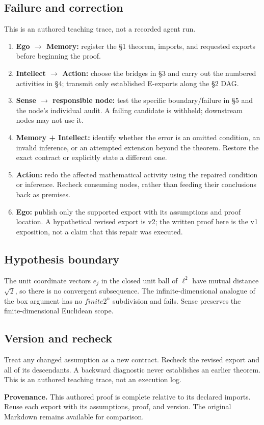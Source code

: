 \documentclass[preprint,12pt,aps,pra,showkeys,amsmath,amssymb,superscriptaddress,floatfix]{revtex4-2}
\theoremstyle{definition}
\theoremstyle{remark}
\providecommand{\tightlist}{\setlength{\itemsep}{2pt}\setlength{\parskip}{0pt}}
\begin{document}
\subsection{Failure and correction}
This is an authored teaching trace, not a recorded agent run.

\begin{enumerate}
\def\labelenumi{\arabic{enumi}.}
\tightlist
\item
  \textbf{Ego \(\to\) Memory:} register the §1 theorem, imports, and
  requested exports before beginning the proof.
\item
  \textbf{Intellect \(\to\) Action:} choose the bridges in §3 and carry
  out the numbered activities in §4; transmit only established E-exports
  along the §2 DAG.
\item
  \textbf{Sense \(\to\) responsible node:} test the specific
  boundary/failure in §5 and the node's individual audit. A failing
  candidate is withheld; downstream nodes may not use it.
\item
  \textbf{Memory + Intellect:} identify whether the error is an omitted
  condition, an invalid inference, or an attempted extension beyond the
  theorem. Restore the exact contract or explicitly state a different
  one.
\item
  \textbf{Action:} redo the affected mathematical activity using the
  repaired condition or inference. Recheck consuming nodes, rather than
  feeding their conclusions back as premises.
\item
  \textbf{Ego:} publish only the supported export with its assumptions
  and proof location. A hypothetical revised export is v2; the written
  proof here is the v1 exposition, not a claim that this repair was
  executed.
\end{enumerate}

\subsection{Hypothesis boundary}
The unit coordinate vectors \(e_j\) in the closed unit ball of
\(\ell ^{2}\) have mutual distance \(\sqrt{2}\), so there is no
convergent subsequence. The infinite-dimensional analogue of the box
argument has no \(finite2^{n}\) subdivision and fails. Sense preserves
the finite-dimensional Euclidean scope.

\subsection{Version and recheck}
Treat any changed assumption as a new contract. Recheck the revised
export and all of its descendants. A backward diagnostic never
establishes an earlier theorem. This is an authored teaching trace, not
an execution log.

\par\medskip\begingroup\small\linespread{1.0}\selectfont\noindent\textbf{Provenance.} This authored proof is complete relative to its declared imports. Reuse
each export with its assumptions, proof, and version. The original
Markdown remains available for comparison.
\par\endgroup
\end{document}
